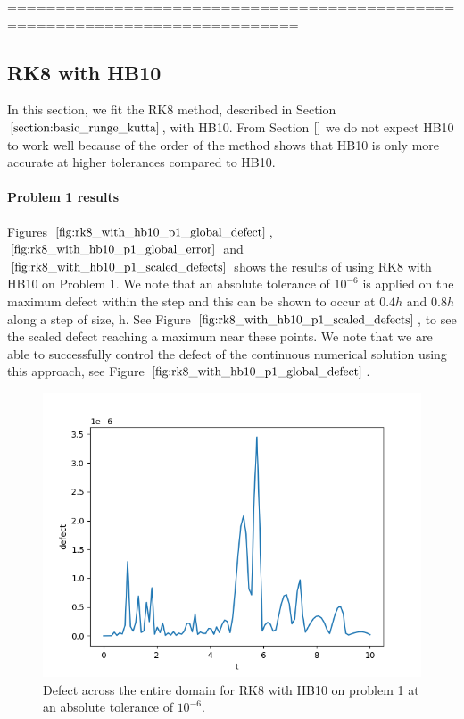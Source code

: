 ============================================================================
\subsection{RK8 with HB10}
In this section, we fit the RK8 method, described in Section $\ref{section:basic_runge_kutta}$, with HB10. From Section $\ref{}$ we do not expect HB10 to work well because of the order of the method shows that HB10 is only more accurate at higher tolerances compared to HB10.

\paragraph{Problem 1 results}
Figures $\ref{fig:rk8_with_hb10_p1_global_defect}$, $\ref{fig:rk8_with_hb10_p1_global_error}$ and $\ref{fig:rk8_with_hb10_p1_scaled_defects}$ shows the results of using RK8 with HB10 on Problem 1. We note that an absolute tolerance of $10^{-6}$ is applied on the maximum defect within the step and this can be shown to occur at $0.4h$ and $0.8h$ along a step of size, h. See Figure $\ref{fig:rk8_with_hb10_p1_scaled_defects}$, to see the scaled defect reaching a maximum near these points. We note that we are able to successfully control the defect of the continuous numerical solution using this approach, see Figure $\ref{fig:rk8_with_hb10_p1_global_defect}$. 
 

\begin{figure}[H]
\centering
\includegraphics[width=0.7\linewidth]{./figures/rk8_with_hb10_p1_global_defect}
\caption{Defect across the entire domain for RK8 with HB10 on problem 1 at an absolute tolerance of $10^{-6}$.}
\label{fig:rk8_with_hb10_p1_global_defect}
\end{figure}

